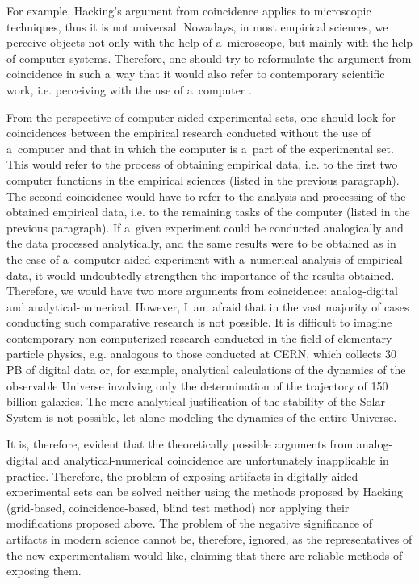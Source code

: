 For example, Hacking's argument from coincidence applies to microscopic techniques, thus it is not universal. Nowadays, in most empirical sciences, we perceive objects not only with the help of a~microscope, but mainly with the help of computer systems. Therefore, one should try to reformulate the argument from coincidence in such a~way that it would also refer to contemporary scientific work, i.e. perceiving with the use of a~computer 
\parencite[][]{bialynicki-birula_modeling_2004}.%




From the perspective of computer-aided experimental sets, one should look for coincidences between the empirical research conducted without the use of a~computer and that in which the computer is a~part of the experimental set. This would refer to the process of obtaining empirical data, i.e. to the first two computer functions in the empirical sciences (listed in the previous paragraph). The second coincidence would have to refer to the analysis and processing of the obtained empirical data, i.e. to the remaining tasks of the computer (listed in the previous paragraph). If a~given experiment could be conducted analogically and the data processed analytically, and the same results were to be obtained as in the case of a~computer-aided experiment with a~numerical analysis of empirical data, it would undoubtedly strengthen the importance of the results obtained. Therefore, we would have two more arguments from coincidence: analog-digital and analytical-numerical. However, I~am afraid that in the vast majority of cases conducting such comparative research is not possible. It is difficult to imagine contemporary non-computerized research conducted in the field of elementary particle physics, e.g. analogous to those conducted at CERN, which collects 30 PB of digital data 
\parencite[][]{leciejewski_digital_2015} %
 or, for example, analytical calculations of the dynamics of the observable Universe involving only the determination of the trajectory of 150 billion galaxies. The mere analytical justification of the stability of the Solar System is not possible, let alone modeling the dynamics of the entire Universe.



It is, therefore, evident that the theoretically possible arguments from analog-digital and analytical-numerical coincidence are unfortunately inapplicable in practice. Therefore, the problem of exposing artifacts in digitally-aided experimental sets can be solved neither using the methods proposed by Hacking (grid-based, coincidence-based, blind test method) nor applying their modifications proposed above. The problem of the negative significance of artifacts in modern science cannot be, therefore, ignored, as the representatives of the new experimentalism would like, claiming that there are reliable methods of exposing them.



